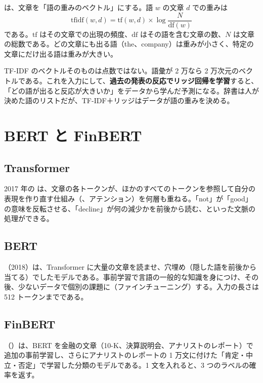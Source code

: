  は、文章を「語の重みのベクトル」にする。語 $w$ の文章 $d$ での重みは
\begin{equation}
\text{tfidf}(w,d) = \text{tf}(w,d)\times\log\frac{N}{\text{df}(w)}
\end{equation}
である。$\text{tf}$ はその文章での出現の頻度、$\text{df}$ はその語を含む文章の数、$N$ は文章の総数である。どの文章にも出る語（the、company）は重みが小さく、特定の文章にだけ出る語は重みが大きい。

TF-IDF のベクトルそのものは点数ではない。語彙が 2 万なら 2 万次元のベクトルである。これを入力にして、\textbf{過去の発表の反応でリッジ回帰を学習}すると、「どの語が出ると反応が大きいか」をデータから学んだ予測になる。辞書は人が決めた語のリストだが、TF-IDF＋リッジはデータが語の重みを決める。

\section{BERT と FinBERT}

\subsection{Transformer}

2017 年の は、文章の各トークンが、ほかのすべてのトークンを参照して自分の表現を作り直す仕組み（、アテンション）を何層も重ねる。「not」が「good」の意味を反転させる、「decline」が何の減少かを前後から読む、といった文脈の処理ができる。

\subsection{BERT}

（2018）は、Transformer に大量の文章を読ませ、穴埋め（隠した語を前後から当てる）でしたモデルである。事前学習で言語の一般的な知識を身につけ、その後、少ないデータで個別の課題に（ファインチューニング）する。入力の長さは 512 トークンまでである。

\subsection{FinBERT}

（）は、BERT を金融の文章（10-K、決算説明会、アナリストのレポート）で追加の事前学習し、さらにアナリストのレポートの 1 万文に付けた「肯定・中立・否定」で学習した分類のモデルである。1 文を入れると、3 つのラベルの確率を返す。

